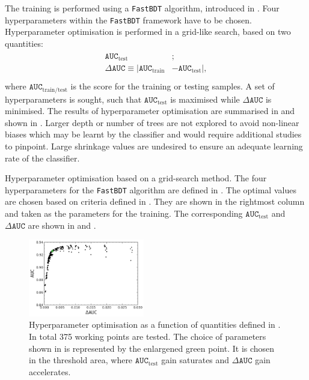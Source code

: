 The training is performed using a \texttt{FastBDT} algorithm, introduced in .
Four hyperparameters within the \texttt{FastBDT} framework have to be chosen.
Hyperparameter optimisation is performed in a grid-like search, based on two quantities:
\begin{align}\label{eq:optimisation_criteria}
    \begin{split}
    \mathtt{AUC}_{\mathrm{test}}&;\\
    \Delta \mathtt{AUC} \equiv |\mathtt{AUC}_{\mathrm{train}}& - \mathtt{AUC}_{\mathrm{test}}|,\\
    \end{split}
\end{align}
where $\mathtt{AUC}_{\mathrm{train}/\mathrm{test}}$ is the \AUC score for the training or testing samples.
A set of hyperparameters is sought, such that $ \mathtt{AUC}_{\mathrm{test}}$ is maximised while $\Delta \mathtt{AUC}$ is minimised.
The results of hyperparameter optimisation are summarised in  and shown in .
Larger depth or number of trees are not explored to avoid non-linear biases which may be learnt by the classifier and would require additional studies to pinpoint.
Large shrinkage values are undesired to ensure an adequate learning rate of the classifier.
\begin{table}[hbtp!]
    \centering
    \caption{\label{tab:grid_search}Hyperparameter optimisation based on a grid-search method.
    The four hyperparameters for the \texttt{FastBDT} algorithm are defined in .
    The optimal values are chosen based on criteria defined in .
    They are shown in the rightmost column and taken as the parameters for the training.
    The corresponding $\mathtt{AUC}_{\mathrm{test}}$ and $\Delta \mathtt{AUC}$ are shown in  and .
    }
    
\end{table}
\begin{figure}[hbtp!]
    \centering
    \includegraphics[width=0.45\textwidth]{figures/continuum_suppression/hyperpar_optimisation.png}
    \caption{\label{fig:hyper_param}Hyperparameter optimisation as a function of quantities defined in .
    In total 375 working points are tested.
    The choice of parameters shown in  is represented by the enlargened green point.
    It is chosen in the threshold area, where $\mathtt{AUC}_{\mathrm{test}}$ gain saturates and $\Delta \mathtt{AUC}$ gain accelerates.
    }
\end{figure}

